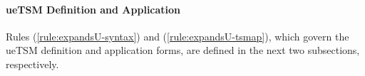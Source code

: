 \paragraph{ueTSM Definition and Application} Rules (\ref{rule:expandsU-syntax}) and (\ref{rule:expandsU-tsmap}), which govern the ueTSM definition and application forms, are defined in the next two subsections, respectively. 




